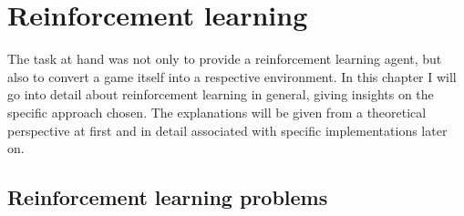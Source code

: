 \chapter{Reinforcement learning}

\label{ch:RL} 

\newcommand{\inlinecode}[1]{\colorbox{evenmorelightgray}{\lstinline[basicstyle=\ttfamily\color{black}]{#1}}}


The task at hand was not only to provide a reinforcement learning agent, but also to convert a game itself into a respective environment. In this chapter I will go into detail about reinforcement learning in general, giving insights on the specific approach chosen. The explanations will be given from a theoretical perspective at first and in detail associated with specific implementations later on.


\section{Reinforcement learning problems}

